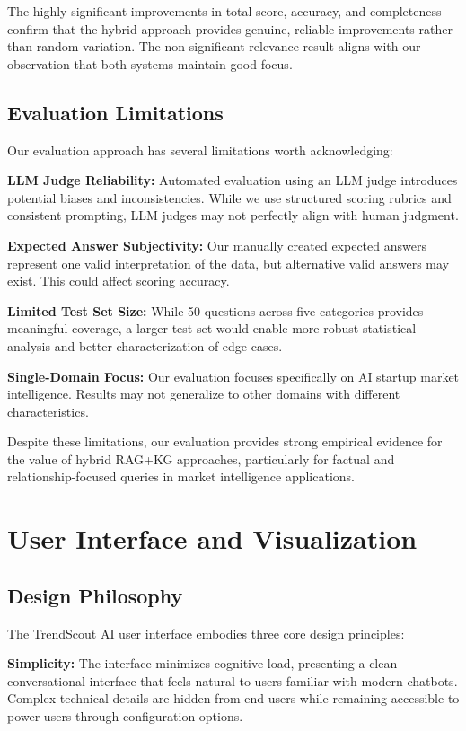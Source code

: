 \documentclass[11pt,twocolumn]{article}
\begin{document}
The highly significant improvements in total score, accuracy, and completeness confirm that the hybrid approach provides genuine, reliable improvements rather than random variation. The non-significant relevance result aligns with our observation that both systems maintain good focus.

\subsection{Evaluation Limitations}

Our evaluation approach has several limitations worth acknowledging:

\textbf{LLM Judge Reliability:} Automated evaluation using an LLM judge introduces potential biases and inconsistencies. While we use structured scoring rubrics and consistent prompting, LLM judges may not perfectly align with human judgment.

\textbf{Expected Answer Subjectivity:} Our manually created expected answers represent one valid interpretation of the data, but alternative valid answers may exist. This could affect scoring accuracy.

\textbf{Limited Test Set Size:} While 50 questions across five categories provides meaningful coverage, a larger test set would enable more robust statistical analysis and better characterization of edge cases.

\textbf{Single-Domain Focus:} Our evaluation focuses specifically on AI startup market intelligence. Results may not generalize to other domains with different characteristics.

Despite these limitations, our evaluation provides strong empirical evidence for the value of hybrid RAG+KG approaches, particularly for factual and relationship-focused queries in market intelligence applications.

\section{User Interface and Visualization}

\subsection{Design Philosophy}

The TrendScout AI user interface embodies three core design principles:

\textbf{Simplicity:} The interface minimizes cognitive load, presenting a clean conversational interface that feels natural to users familiar with modern chatbots. Complex technical details are hidden from end users while remaining accessible to power users through configuration options.
\end{document}
